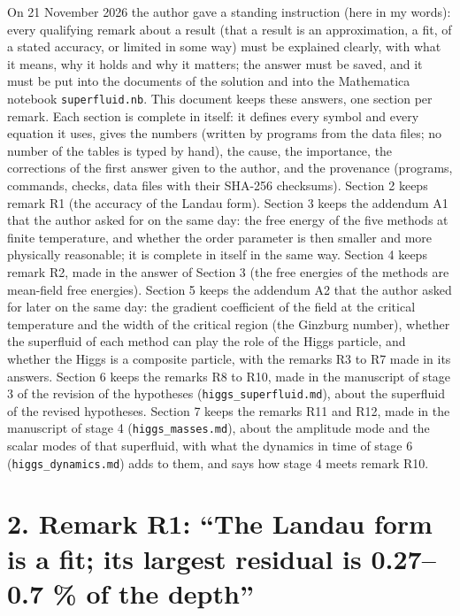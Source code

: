 \documentclass[
  10pt,
]{article}
\begin{document}
On 21 November 2026 the author gave a standing instruction (here in my
words): every qualifying remark about a result (that a result is an
approximation, a fit, of a stated accuracy, or limited in some way) must
be explained clearly, with what it means, why it holds and why it
matters; the answer must be saved, and it must be put into the documents
of the solution and into the Mathematica notebook
\texttt{superfluid.nb}. This document keeps these answers, one section
per remark. Each section is complete in itself: it defines every symbol
and every equation it uses, gives the numbers (written by programs from
the data files; no number of the tables is typed by hand), the cause,
the importance, the corrections of the first answer given to the author,
and the provenance (programs, commands, checks, data files with their
SHA-256 checksums). Section 2 keeps remark R1 (the accuracy of the
Landau form). Section 3 keeps the addendum A1 that the author asked for
on the same day: the free energy of the five methods at finite
temperature, and whether the order parameter is then smaller and more
physically reasonable; it is complete in itself in the same way. Section
4 keeps remark R2, made in the answer of Section 3 (the free energies of
the methods are mean-field free energies). Section 5 keeps the addendum
A2 that the author asked for later on the same day: the gradient
coefficient of the field at the critical temperature and the width of
the critical region (the Ginzburg number), whether the superfluid of
each method can play the role of the Higgs particle, and whether the
Higgs is a composite particle, with the remarks R3 to R7 made in its
answers. Section 6 keeps the remarks R8 to R10, made in the manuscript
of stage 3 of the revision of the hypotheses
(\texttt{higgs\_superfluid.md}), about the superfluid of the revised
hypotheses. Section 7 keeps the remarks R11 and R12, made in the
manuscript of stage 4 (\texttt{higgs\_masses.md}), about the amplitude
mode and the scalar modes of that superfluid, with what the dynamics in
time of stage 6 (\texttt{higgs\_dynamics.md}) adds to them, and says how
stage 4 meets remark R10.

\hypertarget{remark-r1-the-landau-form-is-a-fit-its-largest-residual-is-0.270.7-of-the-depth}{%
\section{2. Remark R1: ``The Landau form is a fit; its largest residual
is 0.27--0.7 \% of the
depth''}\label{remark-r1-the-landau-form-is-a-fit-its-largest-residual-is-0.270.7-of-the-depth}}
\end{document}
